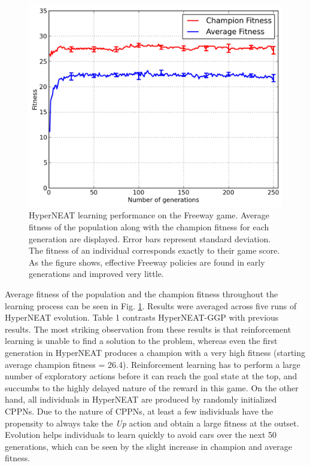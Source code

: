 \documentclass{acm_proc_article-sp}
\begin{document}
\begin{figure}[ht]
\begin{center}
\includegraphics[width=\columnwidth]{figures/freeway-results.png}
\end{center}
\caption{HyperNEAT learning performance on the Freeway game. Average fitness of the population along with the champion fitness for each generation are displayed. Error bars represent standard deviation. The fitness of an individual corresponds exactly to their game score. As the figure shows, effective Freeway policies are found in early generations and improved very little.}
\label{fig:freeway-curve}
\end{figure}


Average fitness of the population and the champion fitness throughout the learning process can be seen in Fig. \ref{fig:freeway-curve}. Results were averaged across five runs of HyperNEAT evolution. Table 1 contrasts HyperNEAT-GGP with previous results. The most striking observation from these results is that reinforcement learning is unable to find a solution to the problem, whereas even the first generation in HyperNEAT produces a champion with a very high fitness (starting average champion fitness = 26.4). Reinforcement learning has to perform a large number of exploratory actions before it can reach the goal state at the top, and succumbs to the highly delayed nature of the reward in this game. On the other hand, all individuals in HyperNEAT are produced by randomly initialized CPPNs. Due to the nature of CPPNs, at least a few individuals have the propensity to always take the \textit{Up} action and obtain a large fitness at the outset. Evolution helps individuals to learn quickly to avoid cars over the next 50 generations, which can be seen by the slight increase in champion and average fitness.
\end{document}
